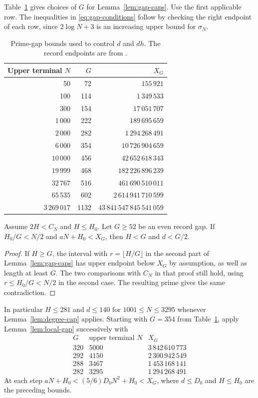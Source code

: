 Table~\ref{tab:gap-bounds} gives choices of \(G\) for
Lemma~\ref{lem:gap-caps}. Use the first applicable row. The
inequalities in \eqref{eq:gap-conditions} follow by checking
the right endpoint of each row, since \(2\log N+3\) is an
increasing upper bound for \(\sigma_N\).
\begin{table}[ht]
\centering
\begin{tabular}{r r r}
\hline
Upper terminal \(N\) & \(G\) & \(X_G\)\\
\hline
50 & 72 & \(155\,921\)\\
100 & 114 & \(1\,349\,533\)\\
300 & 154 & \(17\,051\,707\)\\
\(1\,000\) & 222 & \(189\,695\,659\)\\
\(2\,000\) & 282 & \(1\,294\,268\,491\)\\
\(6\,000\) & 354 & \(10\,726\,904\,659\)\\
\(10\,000\) & 456 & \(42\,652\,618\,343\)\\
\(19\,999\) & 468 & \(182\,226\,896\,239\)\\
\(32\,767\) & 516 & \(461\,690\,510\,011\)\\
\(65\,535\) & 602 & \(2\,614\,941\,710\,599\)\\
\(3\,269\,017\) & 1132 & \(43\,841\,547\,845\,541\,059\)\\
\hline
\end{tabular}
\caption{Prime-gap bounds used to control \(d\) and \(dh\). The record
endpoints are from \cite[Table~8]{oliveira-gaps}.}
\label{tab:gap-bounds}
\end{table}

\begin{lemma}
\label{lem:local-gap}
Assume \(2H<C_N\) and \(H\le H_0\). Let \(G\ge52\) be an even record
gap. If \(H_0/G<N/2\) and \(aN+H_0<X_G\), then
\(H<G\) and \(d<G/2\).
\end{lemma}
\begin{proof}
If \(H\ge G\), the interval with \(r=\lfloor H/G\rfloor\) in the
second part of Lemma~\ref{lem:gap-caps} has upper endpoint below
\(X_G\) by assumption, as well as length at least \(G\). The two
comparisons with \(C_N\) in that proof still hold, using
\(r\le H_0/G<N/2\) in the second case. The resulting prime gives
the same contradiction.
\end{proof}

In particular \(H\le281\) and \(d\le140\) for
\(1001\le N\le3295\) whenever Lemma~\ref{lem:degree-cap} applies.
Starting with \(G=354\) from
Table~\ref{tab:gap-bounds}, apply Lemma~\ref{lem:local-gap}
successively with
\[
\begin{array}{r|r|r}
G&\text{upper terminal }N&X_G\\ \hline
320&5000&3\,842\,610\,773\\
292&4150&2\,300\,942\,549\\
288&3467&1\,453\,168\,141\\
282&3295&1\,294\,268\,491
\end{array}
\]
At each step \(aN+H_0<(5/6)D_0N^2+H_0<X_G\), where \(d\le D_0\)
and \(H\le H_0\) are the preceding bounds.

